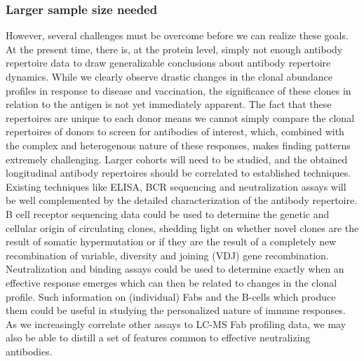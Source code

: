 \subsubsection{Larger sample size needed}
However, several challenges must be overcome before we can realize these goals. At the present time, there is, at the protein level, simply not enough antibody repertoire data to draw generalizable conclusions about antibody repertoire dynamics. While we clearly observe drastic changes in the clonal abundance profiles in response to disease and vaccination, the significance of these clones in relation to the antigen is not yet immediately apparent. The fact that these repertoires are unique to each donor means we cannot simply compare the clonal repertoires of donors to screen for antibodies of interest, which, combined with the complex and heterogenous nature of these responses, makes finding patterns extremely challenging. Larger cohorts will need to be studied, and the obtained longitudinal antibody repertoires should be correlated to established techniques. Existing techniques like ELISA, BCR sequencing and neutralization assays will be well complemented by the detailed characterization of the antibody repertoire. B cell receptor sequencing data could be used to determine the genetic and cellular origin of circulating clones, shedding light on whether novel clones are the result of somatic hypermutation or if they are the result of a completely new recombination of variable, diversity and joining (VDJ) gene recombination. Neutralization and binding assays could be used to determine exactly when an effective response emerges which can then be related to changes in the clonal profile. Such information on (individual) Fabs and the B-cells which produce them could be useful in studying the personalized nature of immune responses. As we increasingly correlate other assays to LC-MS Fab profiling data, we may also be able to distill a set of features common to effective neutralizing antibodies.

